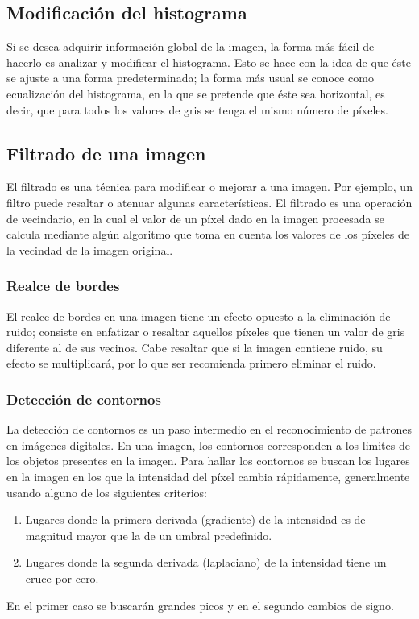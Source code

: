 \subsection{Modificación del histograma}
Si se desea adquirir información global de la imagen, la forma más fácil de hacerlo es analizar y modificar el histograma. Esto se hace con la idea de que éste se ajuste a una forma predeterminada; la forma más usual se conoce como ecualización del histograma, en la que se pretende que éste sea horizontal, es decir, que para todos los valores de gris se tenga el mismo número de píxeles.

\subsection{Filtrado de una imagen}
El filtrado es una técnica para modificar o mejorar a una imagen. Por ejemplo, un filtro puede resaltar o atenuar algunas características. El filtrado es una operación de vecindario, en la cual el valor de un píxel dado en la imagen procesada se calcula mediante algún algoritmo que toma en cuenta los valores de los píxeles de la vecindad de la imagen original.

\subsubsection{Realce de bordes}
El realce de bordes en una imagen tiene un efecto opuesto a la eliminación de ruido; consiste en enfatizar o resaltar aquellos píxeles que tienen un valor de gris diferente al de sus vecinos. Cabe resaltar que si la imagen contiene ruido, su efecto se multiplicará, por lo que ser recomienda primero eliminar el ruido.

\subsubsection{Detección de contornos}
La detección de contornos es un paso intermedio en el reconocimiento de patrones en imágenes digitales. En una imagen, los contornos corresponden a los limites de los objetos presentes en la imagen. Para hallar los contornos se buscan los lugares en la imagen en los que la intensidad del píxel cambia rápidamente, generalmente usando alguno de los siguientes criterios:

\begin{enumerate}
	\item Lugares donde la primera derivada (gradiente) de la intensidad es de magnitud mayor que la de un umbral predefinido.
	\item Lugares donde la segunda derivada (laplaciano) de la intensidad tiene un
	cruce por cero.
\end{enumerate}

En el primer caso se buscarán grandes picos y en el segundo cambios de signo.
